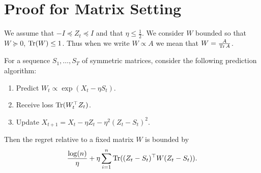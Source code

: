 \documentclass[11pt]{article}
\begin{document}
\section{Proof for Matrix Setting}
We assume that $-I \preceq Z_t \preceq I$  and that $\eta \leq \frac{1}{2}$. We 
consider $W$ bounded so that $W \succeq 0$, $\operatorname{Tr}(W) \leq 1$. Thus when we write 
$W \propto A$ we mean that $W = \frac{A}{\operatorname{Tr}{A}}$.
\begin{theorem}
\label{thm:matrix}
For a sequence $S_1, \ldots, S_T$ of symmetric matrices, consider the following 
prediction algorithm:
\begin{enumerate}
\item Predict $W_t \propto \exp(X_t - \eta S_t)$.
\item Receive loss $\operatorname{Tr}(W_t^{\top}Z_t)$.
\item Update $X_{t+1} = X_t - \eta Z_t - \eta^2 (Z_t-S_t)^2$.
\end{enumerate}
Then the regret relative to a fixed matrix $W$ is bounded by
\[ \frac{\log(n)}{\eta} + \eta \sum_{i=1}^n \operatorname{Tr}((Z_t-S_t)^{\top}W(Z_t-S_t)). \]
\end{theorem}
% 
\end{document}
